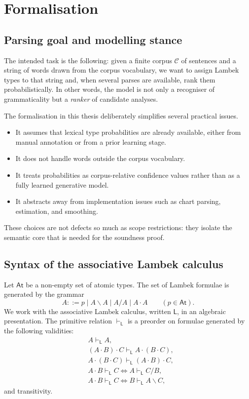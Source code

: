 \documentclass[12pt,a4paper]{report}
\theoremstyle{definition}
\newcommand{\LC}{\mathsf{L}}
\newcommand{\At}{\mathsf{At}}
\newcommand{\concat}{\mathbin{\cdot}}
\begin{document}
\chapter{Formalisation}

\section{Parsing goal and modelling stance}
The intended task is the following: given a finite corpus $\mathcal C$ of sentences and a string of
words drawn from the corpus vocabulary, we want to assign Lambek types to that string and,
when several parses are available, rank them probabilistically. In other words, the model is not
only a recogniser of grammaticality but a \emph{ranker} of candidate analyses.

The formalisation in this thesis deliberately simplifies several practical issues.
\begin{itemize}
    \item It assumes that lexical type probabilities are already available, either from manual
    annotation or from a prior learning stage.
    \item It does not handle words outside the corpus vocabulary.
    \item It treats probabilities as corpus-relative confidence values rather than as a fully learned
    generative model.
    \item It abstracts away from implementation issues such as chart parsing, estimation, and
    smoothing.
\end{itemize}
These choices are not defects so much as scope restrictions: they isolate the semantic core that
is needed for the soundness proof.

\section{Syntax of the associative Lambek calculus}
Let $\At$ be a non-empty set of atomic types. The set of Lambek formulae is generated by the
grammar
\[
A ::= p \mid A \backslash A \mid A / A \mid A \concat A
\qquad (p \in \At).
\]
We work with the associative Lambek calculus, written $\LC$, in an algebraic presentation. The
primitive relation $\vdash_{\LC}$ is a preorder on formulae generated by the following validities:
\begin{align*}
& A \vdash_{\LC} A, \\
& (A \concat B) \concat C \vdash_{\LC} A \concat (B \concat C), \\
& A \concat (B \concat C) \vdash_{\LC} (A \concat B) \concat C, \\
& A \concat B \vdash_{\LC} C \iff A \vdash_{\LC} C/B, \\
& A \concat B \vdash_{\LC} C \iff B \vdash_{\LC} A\backslash C,
\end{align*}
and transitivity.
\end{document}
